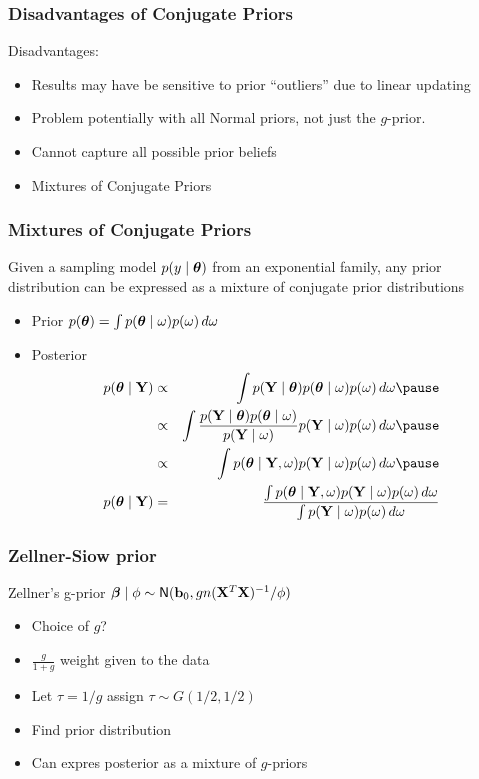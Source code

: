 \documentclass[handout]{beamer}
\begin{document}
\begin{frame}
  \frametitle{Disadvantages of Conjugate Priors}
  Disadvantages: \pause
\begin{itemize}
\item Results  may have be sensitive to prior ``outliers'' due to
  linear updating \pause
\item Problem potentially with all Normal priors, not just the
  $g$-prior. \pause
\item Cannot capture all possible prior beliefs \pause
\item Mixtures of Conjugate Priors
\end{itemize}
\end{frame}
\begin{frame}
  \frametitle{Mixtures of Conjugate Priors}
  \begin{theorem}  Given a sampling model
  $p(y \mid \boldsymbol{\theta})$ from an exponential family, any prior distribution
  can be expressed as a mixture of conjugate prior distributions 
 \end{theorem}

 \begin{itemize}
 \item Prior $p(\boldsymbol{\theta}) = \int p(\boldsymbol{\theta} \mid \omega) p(\omega)\, d \omega$ \pause
 \item Posterior \pause
   \begin{eqnarray*}
   p(\t \mid \Y)  &\propto & \int p(\Y \mid \t) p(\t \mid \omega)
   p(\omega) \, d\omega \pause \\
 & \propto & \int  \frac{  p(\Y \mid \t) p(\t \mid \omega) } {p(\Y \mid
   \omega)}  p(\Y \mid
 \omega) p(\omega ) \, d \omega  \pause \\
& \propto & \int p(\t \mid \Y, \omega)  p(\Y \mid
 \omega) p(\omega ) \, d \omega \pause \\
 p(\t \mid \Y) & =  & \frac{\int p(\t \mid \Y, \omega)  p(\Y \mid
 \omega) p(\omega ) \, d \omega }
{\int p(\Y \mid
 \omega) p(\omega ) \, d \omega }
       \end{eqnarray*}

 \end{itemize}
\end{frame}

\begin{frame}
  \frametitle{Zellner-Siow prior}
Zellner's g-prior $\boldsymbol{\beta} \mid \phi \sim \textsf{N}(\mathbf{b}_0, g n 
    (\mathbf{X}^T\mathbf{X})^{-1}/\phi)$ \pause

\begin{itemize}
\item Choice of $g$?  \pause
\item $\frac{g}{1 + g}$  weight given to the data \pause
\item Let $\tau = 1/g$ assign $\tau \sim G(1/2, 1/2)$
\item Find prior distribution
\item Can expres posterior as a mixture of $g$-priors
\end{itemize}
\end{frame}
\end{document}

